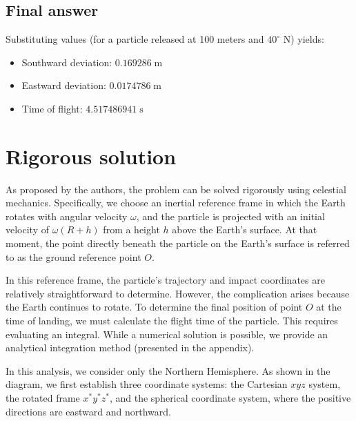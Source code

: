 \documentclass[11pt,en]{elegantpaper}
\begin{document}
\subsection{Final answer}
Substituting values (for a particle released at 100 meters and $40^{\circ}$ N) yields:
\begin{itemize}
	\item Southward deviation: $0.169286\;\mathrm{m}$
	\item Eastward deviation: $0.0174786\;\mathrm{m}$
	\item Time of flight: $4.517486941\;\mathrm{s}$
\end{itemize}




\section{Rigorous solution}

As proposed by the authors, the problem can be solved rigorously using celestial mechanics. Specifically, we choose an inertial reference frame in which the Earth rotates with angular velocity $\omega$, and the particle is projected with an initial velocity of $\omega(R + h)$ from a height $h$ above the Earth's surface. At that moment, the point directly beneath the particle on the Earth's surface is referred to as the ground reference point $O$. 

In this reference frame, the particle's trajectory and impact coordinates are relatively straightforward to determine. However, the complication arises because the Earth continues to rotate. To determine the final position of point $O$ at the time of landing, we must calculate the flight time of the particle. This requires evaluating an integral. While a numerical solution is possible, we provide an analytical integration method (presented in the appendix).

In this analysis, we consider only the Northern Hemisphere. As shown in the diagram, we first establish three coordinate systems: the Cartesian $x y z$ system, the rotated frame $x^{*}y^{*}z^{*}$, and the spherical coordinate system, where the positive directions are eastward and northward.
\end{document}
